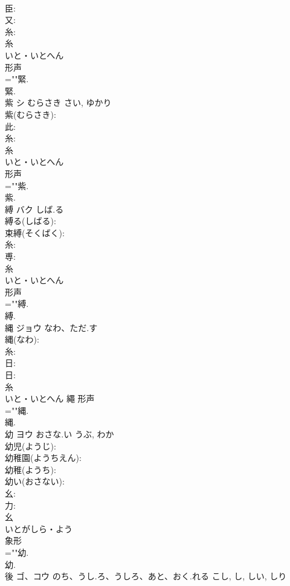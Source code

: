 \documentclass[8pt]{extreport}
\begin{document}
\begin{CJK}{UTF8}{min}
\\	臣: 
\\	又: 
\\	糸: 
\\	糸	
\\	いと・いとへん	
\\	形声 
\\	=""緊.
\\	緊.
\\	紫	シ	むらさき	さい, ゆかり	
\\	紫(むらさき): 
\\	此: 
\\	糸: 
\\	糸	
\\	いと・いとへん	
\\	形声 
\\	=""紫.
\\	紫.
\\	縛	バク	しば.る		
\\	縛る(しばる): 
\\	束縛(そくばく): 
\\	糸: 
\\	尃: 
\\	糸	
\\	いと・いとへん	
\\	形声 
\\	=""縛.
\\	縛.
\\	縄	ジョウ	なわ、ただ.す		
\\	縄(なわ): 
\\	糸: 
\\	日: 
\\	日: 
\\	糸	
\\	いと・いとへん	繩	形声 
\\	=""縄.
\\	縄.
\\	幼	ヨウ	おさな.い	うぶ, わか	
\\	幼児(ようじ): 
\\	幼稚園(ようちえん): 
\\	幼稚(ようち): 
\\	幼い(おさない): 
\\	幺: 
\\	力: 
\\	幺	
\\	いとがしら・よう	
\\	象形 
\\	=""幼.
\\	幼.
\\	後	ゴ、コウ	のち、うし.ろ、うしろ、あと、おく.れる	こし, し, しい, しり	

\end{CJK}
\end{document}

